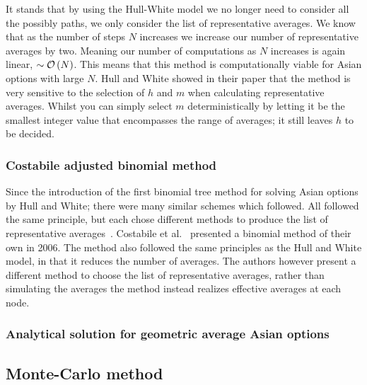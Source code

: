 It stands that by using the Hull-White model we no longer need to consider all the possibly paths, we only consider the list of representative averages. We know that as the number of steps \(N\) increases we increase our number of representative averages by two. Meaning our number of computations as \(N\) increases is again linear, \(\sim\mathcal{O}\left(N\right)\). This means that this method is computationally viable for Asian options with large \(N\).
\nline{}
Hull and White showed in their paper that the method is very sensitive to the selection of \(h\) and \(m\) when calculating representative averages. Whilst you can simply select \(m\) deterministically by letting it be the smallest integer value that encompasses the range of averages; it still leaves \(h\) to be decided.

\subsubsection{Costabile adjusted binomial method}

Since the introduction of the first binomial tree method for solving Asian options by Hull and White; there were many similar schemes which followed. All followed the same principle, but each chose different methods to produce the list of representative averages~\cite{barraquand1996pricing, chalasani1997accurate, klassen2001simple}. Costabile et al.~\cite{costabile2006adjusted} presented a binomial method of their own in 2006. The method also followed the same principles as the Hull and White model, in that it reduces the number of averages. The authors however present a different method to choose the list of representative averages, rather than simulating the averages the method instead realizes effective averages at each node.

\subsubsection{Analytical solution for geometric average Asian options}

\subsection{Monte-Carlo method}